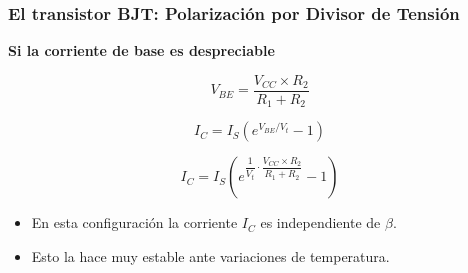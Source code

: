\begin{frame}[t]
    \frametitle{El transistor BJT: Polarización por Divisor de Tensión}

    \begin{multicols}{2}
        \begin{figure}[H]
            \centering
        \end{figure}

        \newpage
        \textbf{Si la corriente de base es despreciable}

        \[ V_{BE} = \dfrac{V_{CC} \times R_2}{R_1 + R_2} \]

        \[ I_C = I_S (e^{V_{BE}/V_t}-1) \]
        
        \[ I_C = I_S (e^{\dfrac{1}{V_t} \cdot \dfrac{V_{CC} \times R_2}{R_1 + R_2}}-1) \]

        \begin{itemize}
            \item En esta configuración la corriente $I_C$ es independiente de $\beta$.
            \item Esto la hace muy estable ante variaciones de temperatura.
        \end{itemize}
        
    \end{multicols}

\end{frame} 


